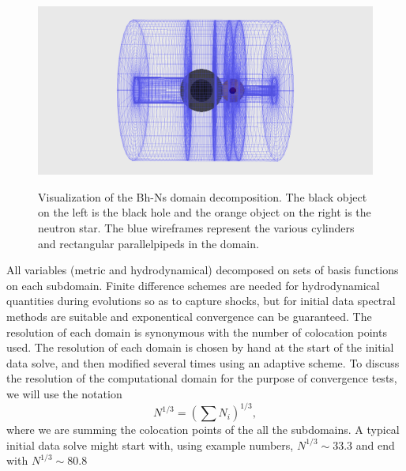 \begin{center}
\begin{figure}[!ht]
\includegraphics[scale=0.45]{chap4/BhNsDomain.png}
\label{fig:BhNsDomain}
\caption[Visualization of the Bh-Ns domain decomposition.]{Visualization of the Bh-Ns domain decomposition. The black object on the left is the black hole and the orange object on the right is the neutron star. The blue wireframes represent the various cylinders and rectangular parallelpipeds in the domain.}
\end{figure}
\end{center}

All variables (metric and hydrodynamical) decomposed on sets of basis functions on each subdomain. Finite difference schemes are needed for hydrodynamical quantities during evolutions so as to capture shocks, but for initial data spectral methods are suitable and exponentical convergence can be guaranteed. The resolution of each domain is synonymous with the number of colocation points used. The resolution of each domain is chosen by hand at the start of the initial data solve, and then modified several times using an adaptive scheme. To discuss the resolution of the computational domain for the purpose of convergence tests, we will use the notation
\begin{equation}
N^{1/3}=\left(\sum N_i\right)^{1/3},
\end{equation}
where we are summing the colocation points of the all the subdomains. A typical initial data solve might start with, using example numbers, $N^{1/3}\sim 33.3$ and end with $N^{1/3}\sim 80.8$

